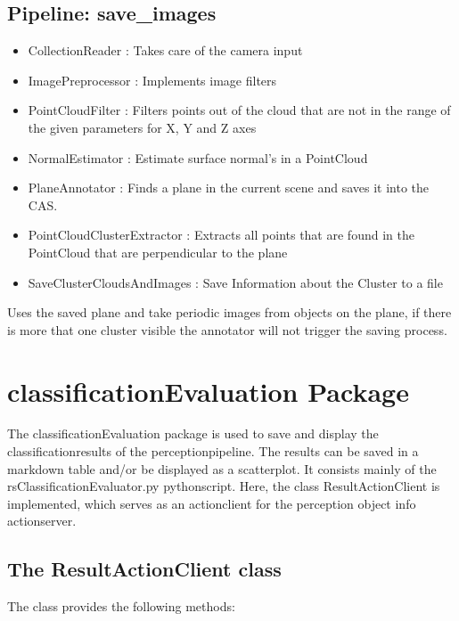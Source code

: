 \documentclass[main.tex]{subfiles}
\begin{document}
			\subsection{Pipeline: save\_images}
\begin{itemize}
	\item CollectionReader : Takes care of the camera input
	\item ImagePreprocessor : Implements image filters  
	\item PointCloudFilter : Filters points out of the cloud that are not in the range of the given parameters for X, Y and Z axes
	\item NormalEstimator : Estimate surface normal's in a PointCloud 
	\item PlaneAnnotator : Finds a plane in the current scene and saves it into the CAS.
	\item PointCloudClusterExtractor : Extracts all points that are found in the PointCloud that are perpendicular to the plane 
	\item SaveClusterCloudsAndImages : Save Information about the Cluster to a file 
\end{itemize}
Uses the saved plane and take periodic images from objects on the plane, if there is more that one cluster visible the annotator will not trigger the saving process.

\section{classificationEvaluation Package}

The classificationEvaluation package is used to save and display the classificationresults of the perceptionpipeline. The results can be saved in a markdown table and/or be displayed as a scatterplot. It consists mainly of the rsClassificationEvaluator.py pythonscript. Here, the class ResultActionClient is implemented, which serves as an actionclient for the perception object info actionserver.\\

\subsection{The ResultActionClient class}
The class provides the following methods:
\end{document}
